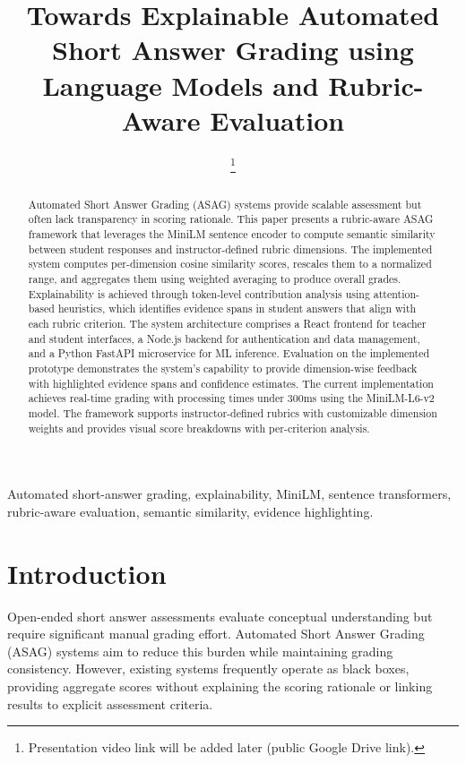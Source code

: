 \documentclass[conference]{IEEEtran}
\title{Towards Explainable Automated Short Answer Grading using Language Models and Rubric-Aware Evaluation}
\author{
    \IEEEauthorblockN{Md. Muhtasim Fuad Fahim\IEEEauthorrefmark{1}}
    \IEEEauthorblockA{
        ID: 221043003\\
        CSE 6231 -- Deep Learning\\
        Prepared for: Dr. Md. Hasanul Kabir
    }
    \thanks{\IEEEauthorrefmark{1}Presentation video link will be added later (public Google Drive link).}
}
\begin{document}
\maketitle

\begin{abstract}
Automated Short Answer Grading (ASAG) systems provide scalable assessment but often lack transparency in scoring rationale. This paper presents a rubric-aware ASAG framework that leverages the MiniLM sentence encoder to compute semantic similarity between student responses and instructor-defined rubric dimensions. The implemented system computes per-dimension cosine similarity scores, rescales them to a normalized range, and aggregates them using weighted averaging to produce overall grades. Explainability is achieved through token-level contribution analysis using attention-based heuristics, which identifies evidence spans in student answers that align with each rubric criterion. The system architecture comprises a React frontend for teacher and student interfaces, a Node.js backend for authentication and data management, and a Python FastAPI microservice for ML inference. Evaluation on the implemented prototype demonstrates the system's capability to provide dimension-wise feedback with highlighted evidence spans and confidence estimates. The current implementation achieves real-time grading with processing times under 300ms using the MiniLM-L6-v2 model. The framework supports instructor-defined rubrics with customizable dimension weights and provides visual score breakdowns with per-criterion analysis.
\end{abstract}

\begin{IEEEkeywords}
Automated short-answer grading, explainability, MiniLM, sentence transformers, rubric-aware evaluation, semantic similarity, evidence highlighting.
\end{IEEEkeywords}

\section{Introduction}
Open-ended short answer assessments evaluate conceptual understanding but require significant manual grading effort. Automated Short Answer Grading (ASAG) systems aim to reduce this burden while maintaining grading consistency. However, existing systems frequently operate as black boxes, providing aggregate scores without explaining the scoring rationale or linking results to explicit assessment criteria.
\end{document}
